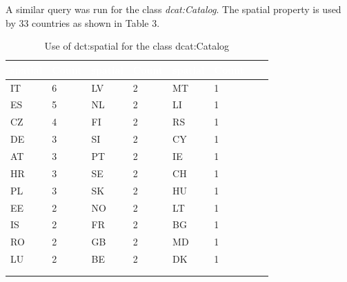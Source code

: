 \documentclass[<options>]{elsarticle}
\begin{document}
A similar query was run for the class \textit{dcat:Catalog}. The spatial property is used by 33 countries as shown in Table 3.

\begin{longtable}{*8l}
\rowcolor{blue!90}
\textcolor{white}{\textbf{spatial}} & \textcolor{white}{\textbf{Count}} & \textcolor{white}{\textbf{spatial}} & \textcolor{white}{\textbf{Count}} & \textcolor{white}{\textbf{spatial}} & \textcolor{white}{\textbf{Count}} \\ \hline
\rowcolor{gray!10} IT &6 &LV &2 &MT &1 \\ \hline
\rowcolor{gray!10} ES &5 &NL &2 &LI &1 \\ \hline
\rowcolor{gray!10} CZ &4 &FI &2 &RS &1 \\ \hline
\rowcolor{gray!10} DE &3 &SI &2 &CY &1 \\ \hline
\rowcolor{gray!10} AT &3 &PT &2 &IE &1 \\ \hline
\rowcolor{gray!10} HR &3 &SE &2 &CH &1 \\ \hline
\rowcolor{gray!10} PL &3 &SK &2 &HU &1 \\ \hline
\rowcolor{gray!10} EE &2 &NO &2 &LT &1 \\ \hline
\rowcolor{gray!10} IS &2 &FR &2 &BG &1 \\ \hline
\rowcolor{gray!10} RO &2 &GB &2 &MD &1 \\ \hline
\rowcolor{gray!10} LU &2 &BE &2 &DK &1 \\ \hline
\\ 
\caption{Use of dct:spatial for the class dcat:Catalog}
\end{longtable}
\end{document}
